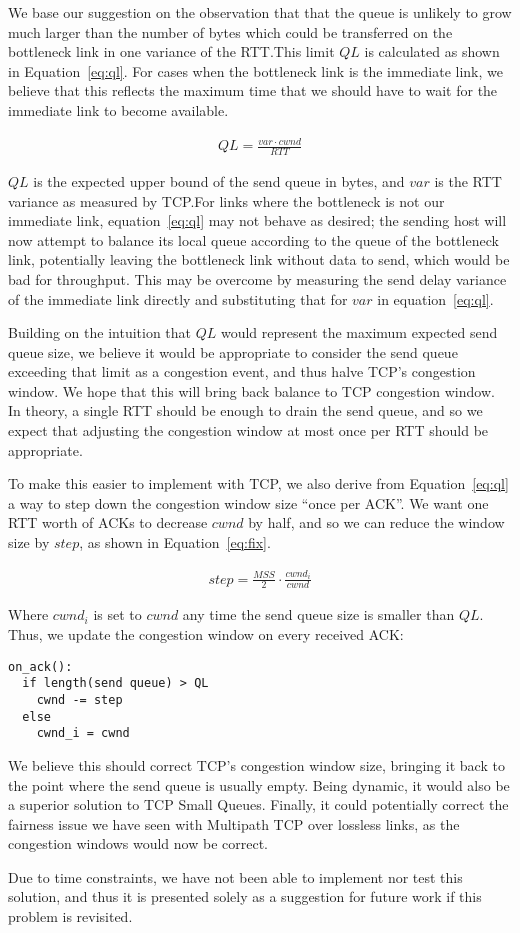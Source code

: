 We base our suggestion on the observation that that the queue is unlikely to
grow much larger than the number of bytes which could be transferred on the
bottleneck link in one variance of the RTT.\@ This limit $QL$ is calculated
as shown in Equation~\ref{eq:ql}. For cases when the bottleneck link
is the immediate link, we believe that this reflects the maximum time that
we should have to wait for the immediate link to become available. 

\begin{align}
  QL = \frac{var \cdot cwnd}{RTT}\label{eq:ql}
\end{align}

$QL$ is the expected upper bound of the send queue in bytes, and $var$ is the RTT
variance as measured by TCP.\@ For links where the bottleneck is not our immediate
link, equation~\ref{eq:ql} may not behave as desired; the sending host will now
attempt to balance its local queue according to the queue of the bottleneck
link, potentially leaving the bottleneck link without data to send, which would
be bad for throughput. This may be overcome by measuring the send delay variance
of the immediate link directly and substituting that for $var$ in
equation~\ref{eq:ql}.

Building on the intuition that $QL$ would represent the maximum expected send
queue size, we believe it would be appropriate to consider the send queue
exceeding that limit as a congestion event, and thus halve TCP's congestion
window. We hope that this will bring back balance to TCP congestion window.  In
theory, a single RTT should be enough to drain the send queue, and so we expect
that adjusting the congestion window at most once per RTT should be appropriate.

To make this easier to implement with TCP, we also derive from Equation~\ref{eq:ql}
a way to step down the congestion window size ``once per ACK''. We want one RTT
worth of ACKs to decrease $cwnd$ by half, and so we can reduce the window size
by $step$, as shown in Equation~\ref{eq:fix}.

\begin{align}
  step = \frac{MSS}{2} \cdot \frac{cwnd_i}{cwnd}\label{eq:fix}
\end{align}

Where $cwnd_i$ is set to $cwnd$ any time the send queue size is smaller than $QL$.
Thus, we update the congestion window on every received ACK:

\begin{verbatim}
on_ack():
  if length(send queue) > QL
    cwnd -= step
  else
    cwnd_i = cwnd
\end{verbatim}

We believe this should correct TCP's congestion window size, bringing it back to
the point where the send queue is usually empty. Being dynamic, it would also be
a superior solution to TCP Small Queues. Finally, it could potentially correct the fairness
issue we have seen with Multipath TCP over lossless links, as the congestion
windows would now be correct.

Due to time constraints, we have not been able to implement nor test this
solution, and thus it is presented solely as a suggestion for future work if
this problem is revisited.
